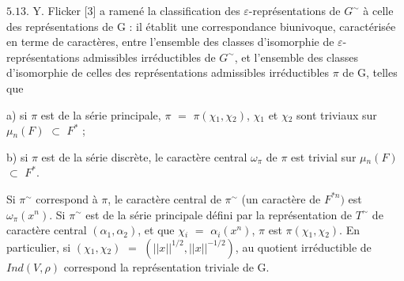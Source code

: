 \documentclass[10pt,a4paper]{article}
\begin{document}
\par $5.13$. Y. Flicker [3] a ramené la classification des $\varepsilon{}$-représentations de $G^\sim$ à celle des représentations de G : il établit une correspondance biunivoque, caractérisée en terme de caractères, entre l'ensemble des classes d'isomorphie de $\varepsilon{}$-représentations admissibles irréductibles de $G^\sim$, et l'ensemble des classes d'isomorphie de celles des représentations admissibles irréductibles $\pi{}$ de G, telles que\par
\par a) si $\pi{}$ est de la série principale, $\pi{}$ $=$ $\pi{}(\chi{}_1,\chi{}_2)$, $\chi{}_1$ et $\chi{}_2$ sont triviaux sur $\mu{}_n(F)$ $\subset{}$ $F^*$ ;\par
\par b) si $\pi{}$ est de la série discrète, le caractère central $\omega{}_\pi{}$ de $\pi{}$ est trivial sur $\mu{}_n(F)$ $\subset{}$ $F^*$.\par
\par Si $\pi{}^\sim$ correspond à $\pi{}$, le caractère central de $\pi{}^\sim$ (un caractère de $F^{*n})$ est $\omega{}_\pi{}(x^n)$. Si $\pi{}^\sim$ est de la série principale défini par la représentation de $T^\sim$ de caractère central $(\alpha{}_1,\alpha{}_2)$, et que $\chi{}_i$ $=$ $\alpha{}_i(x^n)$, $\pi{}$ est $\pi{}(\chi{}_1,\chi{}_2)$. En particulier, si $(\chi{}_1,\chi{}_2)$ $=$ $(||x||^{1/2},||x||^{-1/2})$, au quotient irréductible de $Ind(V,\rho{})$ correspond la représentation triviale de G.\par
\end{document}
